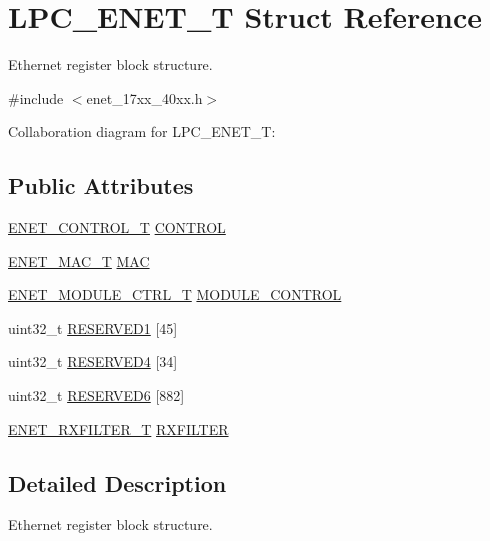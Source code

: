 \hypertarget{structLPC__ENET__T}{}\section{L\+P\+C\+\_\+\+E\+N\+E\+T\+\_\+T Struct Reference}
\label{structLPC__ENET__T}


Ethernet register block structure.  




{\ttfamily \#include $<$enet\+\_\+17xx\+\_\+40xx.\+h$>$}



Collaboration diagram for L\+P\+C\+\_\+\+E\+N\+E\+T\+\_\+T\+:
\subsection*{Public Attributes}
\begin{DoxyCompactItemize}
\item 
\hyperlink{structENET__CONTROL__T}{E\+N\+E\+T\+\_\+\+C\+O\+N\+T\+R\+O\+L\+\_\+T} \hyperlink{structLPC__ENET__T_a40bc06ba6a0ce4949f8a94550cfc9798}{C\+O\+N\+T\+R\+OL}
\item 
\hyperlink{structENET__MAC__T}{E\+N\+E\+T\+\_\+\+M\+A\+C\+\_\+T} \hyperlink{structLPC__ENET__T_a2f1d337b7206673d31a165cee9c6b1aa}{M\+AC}
\item 
\hyperlink{structENET__MODULE__CTRL__T}{E\+N\+E\+T\+\_\+\+M\+O\+D\+U\+L\+E\+\_\+\+C\+T\+R\+L\+\_\+T} \hyperlink{structLPC__ENET__T_a279749cd4018c81be5aa07edfe62d3e7}{M\+O\+D\+U\+L\+E\+\_\+\+C\+O\+N\+T\+R\+OL}
\item 
uint32\+\_\+t \hyperlink{structLPC__ENET__T_a5dd6bf9f10045f3599a60d157f38598b}{R\+E\+S\+E\+R\+V\+E\+D1} \mbox{[}45\mbox{]}
\item 
uint32\+\_\+t \hyperlink{structLPC__ENET__T_a21834684d9ccdf758a76d847fce309d1}{R\+E\+S\+E\+R\+V\+E\+D4} \mbox{[}34\mbox{]}
\item 
uint32\+\_\+t \hyperlink{structLPC__ENET__T_a69971bdb50272af4d797c243b68a640a}{R\+E\+S\+E\+R\+V\+E\+D6} \mbox{[}882\mbox{]}
\item 
\hyperlink{structENET__RXFILTER__T}{E\+N\+E\+T\+\_\+\+R\+X\+F\+I\+L\+T\+E\+R\+\_\+T} \hyperlink{structLPC__ENET__T_a4076c6a080ba8b6e6e7af7343408080b}{R\+X\+F\+I\+L\+T\+ER}
\end{DoxyCompactItemize}


\subsection{Detailed Description}
Ethernet register block structure. 


